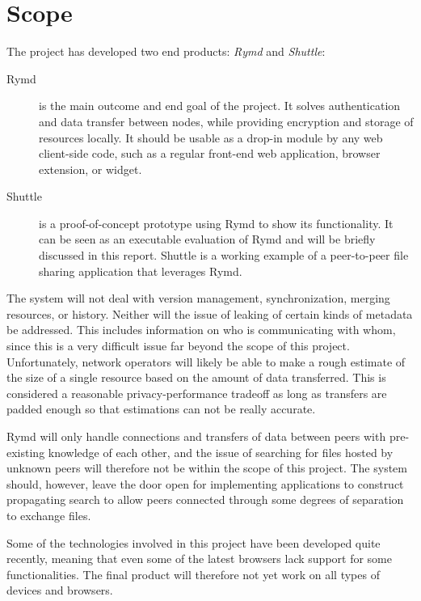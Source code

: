 \section{Scope}

The project has developed two end products: \emph{Rymd} and \emph{Shuttle}:

\begin{description}
\item[Rymd] is the main outcome and end goal of the project. It solves authentication and data transfer between nodes, while providing encryption and storage of resources locally. It should be usable as a drop-in module by any web client-side code, such as a regular front-end web application, browser extension, or widget.

\item[Shuttle] is a proof-of-concept prototype using Rymd to show its functionality. It can be seen as an executable evaluation of Rymd and will be briefly discussed in this report. Shuttle is a working example of a peer-to-peer file sharing application that leverages Rymd.
\end{description}

The system will not deal with version management, synchronization, merging resources, or history. Neither will the issue of leaking of certain kinds of metadata be addressed. This includes information on who is communicating with whom, since this is a very difficult issue far beyond the scope of this project. Unfortunately, network operators will likely be able to make a rough estimate of the size of a single resource based on the amount of data transferred. This is considered a reasonable privacy-performance tradeoff as long as transfers are padded enough so that estimations can not be really accurate.

Rymd will only handle connections and transfers of data between peers with pre-existing knowledge of each other, and the issue of searching for files hosted by unknown peers will therefore not be within the scope of this project. The system should, however, leave the door open for implementing applications to construct propagating search to allow peers connected through some degrees of separation to exchange files.

Some of the technologies involved in this project have been developed quite recently, meaning that even some of the latest browsers lack support for some functionalities. The final product will therefore not yet work on all types of devices and browsers.
